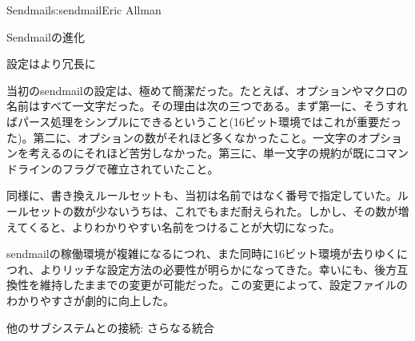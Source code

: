 \begin{aosachapter}{Sendmail}{s:sendmail}{Eric Allman}
\begin{aosasect1}{Sendmailの進化}
\begin{aosasect2}{設定はより冗長に}

当初のsendmailの設定は、極めて簡潔だった。たとえば、オプションやマクロの名前はすべて一文字だった。その理由は次の三つである。まず第一に、そうすればパース処理をシンプルにできるということ(16ビット環境ではこれが重要だった)。第二に、オプションの数がそれほど多くなかったこと。一文字のオプションを考えるのにそれほど苦労しなかった。第三に、単一文字の規約が既にコマンドラインのフラグで確立されていたこと。

同様に、書き換えルールセットも、当初は名前ではなく番号で指定していた。ルールセットの数が少ないうちは、これでもまだ耐えられた。しかし、その数が増えてくると、よりわかりやすい名前をつけることが大切になった。

sendmailの稼働環境が複雑になるにつれ、また同時に16ビット環境が去りゆくにつれ、よりリッチな設定方法の必要性が明らかになってきた。幸いにも、後方互換性を維持したままでの変更が可能だった。この変更によって、設定ファイルのわかりやすさが劇的に向上した。

\end{aosasect2}

\begin{aosasect2}{他のサブシステムとの接続: さらなる統合}


\end{aosasect2}
\end{aosasect1}
\end{aosachapter}
